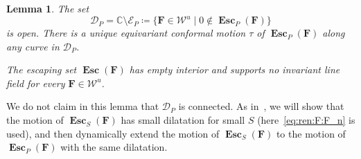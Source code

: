 \documentclass{amsart}
\newcommand{\1}{{\mathbb 1 }}
\newcommand{\bF}{{\mathbf F}}
\newcommand\Unst{{\boldsymbol{\mathcal{W}}^u}}
\newcommand{\C}{\mathbb{C}}
\newtheorem{lem}[thm]{Lemma}
\theoremstyle{remark}
\numberwithin{equation}{section}
\theoremstyle{definition}
\newcommand{\Esc}{{\boldsymbol{\operatorname{Esc}}}}
\newcommand{\ParEsc}{{\boldsymbol{\mathcal E}}}
\newcommand{\DEsc}{{\boldsymbol{\mathcal D}}}
\theoremstyle{nonumberbreak}
\begin{document}
\begin{lem}
\label{lem:esc set moves hol}
The set 
\begin{equation}
\label{eq:lem:esc set moves hol}
\DEsc_P=\C\setminus \ParEsc_P\coloneqq\{ \bF\in \Unst\mid 0\not \in \Esc_P(\bF)\}
\end{equation}
is open. There is a unique equivariant conformal motion $\tau$ of $\Esc_P(\bF)$ along any curve in $\DEsc_P$.

The escaping set $\Esc(\bF)$ has empty interior and supports no invariant line field for every $\bF\in \Unst$.
\end{lem}
\noindent We do not claim in this lemma that $\DEsc_P$ is connected. As in~\cite{Re}, we will show that the motion of $\Esc_S(\bF)$ has small dilatation for small $S$ (here~\eqref{eq:ren:F:F_n} is used), and then dynamically extend the motion of $\Esc_S(\bF)$ to the motion of $\Esc_P(\bF)$ with the same dilatation. 
\end{document}
